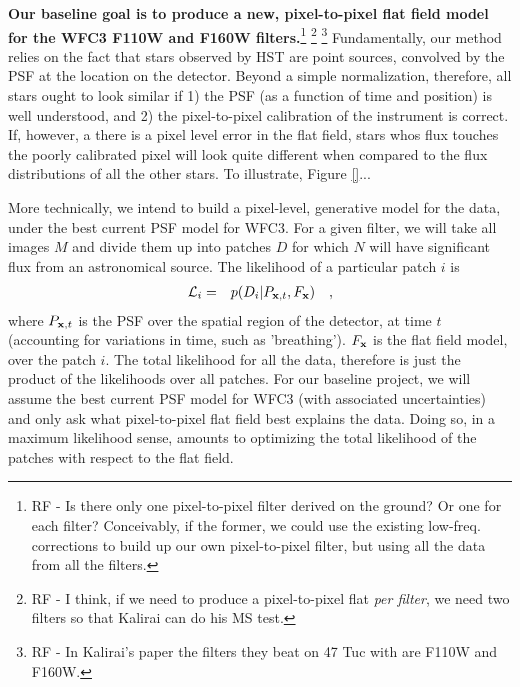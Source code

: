 \documentclass[12pt]{article}
\begin{document}
\textbf{Our baseline goal is to produce a new, pixel-to-pixel
  flat field model for the WFC3 F110W and F160W filters.}\footnote{RF
  - Is there only one pixel-to-pixel filter derived on the ground? Or
  one for each filter?  Conceivably, if the former, we could use the existing
  low-freq. corrections to build up our own pixel-to-pixel filter, but
  using all the data from all the filters.} \footnote{RF - I think, if
  we need to produce a pixel-to-pixel flat \emph{per filter}, we need
  two filters so that Kalirai can do his MS test.} \footnote{RF - In
  Kalirai's paper the filters they beat on 47 Tuc with are F110W and
  F160W.}  Fundamentally, our method relies on the fact that stars
observed by HST are point sources, convolved by the PSF at the
location on the detector.  Beyond a simple normalization, therefore,
all stars ought to look similar if 1) the PSF (as a function of
time and position) is well understood, and 2) the pixel-to-pixel
calibration of the instrument is correct.  If, however, a there is a
pixel level error in the flat field, stars whos flux touches the
poorly calibrated pixel will look quite different when compared to the
flux distributions of all the other stars.  To illustrate, Figure
\ref{}...

More technically, we intend to build a pixel-level, generative model
for the data, under the best current PSF model for WFC3.  For a given
filter, we will take all images $M$ and divide them up into patches $D$
for which $N$ will have significant flux from an astronomical source.
The likelihood of a particular patch $i$ is 
\begin{eqnarray}
\mathcal{L}_i & = & p(D_i|P_{{\bf x},t},F_{{\bf x}})
\quad ,
\end{eqnarray}
where $P_{{\bf x},t}$ is the PSF over the spatial region of the
detector, at time $t$ (accounting for variations in time, such as
'breathing').  $F_{{\bf x}}$ is the flat field model, over the patch
$i$.  The total likelihood for all the data, therefore is just the
product of the likelihoods over all patches.  For our baseline
project, we will assume the best current PSF model for WFC3 (with
associated uncertainties) and only ask what pixel-to-pixel flat field
best explains the data.  Doing so, in a maximum likelihood sense,
amounts to optimizing the total likelihood of the patches with respect
to the flat field.
\end{document}
